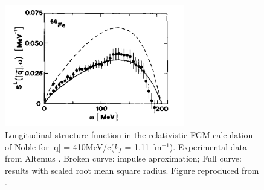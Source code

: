 \begin{figure}[h]
\centering
\includegraphics[width=0.7\textwidth]{figs/swollen.png}
\caption[swollen]{
Longitudinal structure function in the relativistic FGM calculation of Noble
\cite{Noble1981} for |q| = 410MeV/c($k_f$ = 1.11 fm$^{−1}$). Experimental data from Altemus \cite{Altemus1980}.
Broken curve: impulse aproximation; Full curve: results with scaled root mean square
radius.
Figure reproduced from \cite{Orlandini1991}.
\label{fig:swollen}}
\end{figure}


\cite{*}

